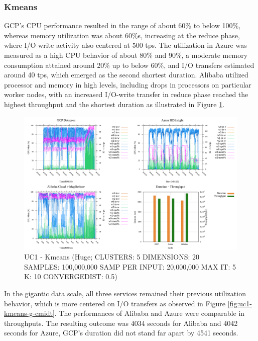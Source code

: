 \documentclass[review]{elsarticle}
\begin{document}
	\subsubsection{Kmeans}
	GCP's CPU performance resulted in the range of about 60\% to below 100\%, whereas memory utilization was about 60\%s, increasing at the reduce phase, where I/O-write activity also centered at 500 tps. The utilization in Azure was measured as a high CPU behavior of about 80\% and 90\%, a moderate memory consumption attained  around 20\% up to below 60\%, and I/O transfers estimated around 40 tps, which emerged as the second shortest duration. Alibaba utilized processor and memory in high levels, including drops in processors on particular worker nodes, with an increased I/O-write transfer in reduce phase reached the highest throughput and the shortest duration as illustrated in Figure \ref{fig:uc1-kmeans-h-cmidt}.
	
	\begin{figure}[p]
		\caption{UC1 - Kmeans (Huge; CLUSTERS: 5 DIMENSIONS: 20 SAMPLES: 100,000,000 SAMP PER INPUT: 20,000,000 MAX IT: 5 K: 10 CONVERGEDIST: 0.5)}
		\label{fig:uc1-kmeans-h-cmidt}
		\includegraphics[width=\textwidth]{uc1-kmeans-h-cmidt}
		\centering
	\end{figure}
	
	In the gigantic data scale, all three services remained their previous utilization behavior, which is more centered on I/O transfers as observed in Figure \ref{fig:uc1-kmeans-g-cmidt}. The performances of Alibaba and Azure were comparable in throughputs. The resulting outcome was 4034 seconds for Alibaba and 4042 seconds for Azure, GCP's duration did not stand far apart by 4541 seconds.
	
\end{document}
